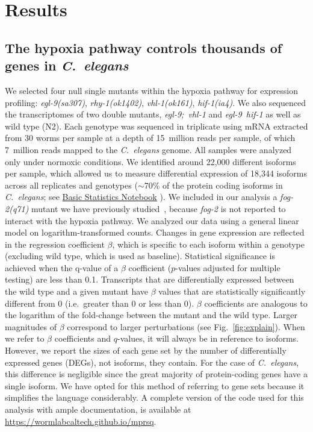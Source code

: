 \documentclass[9pt,twocolumn,twoside]{pnas-new}
\newcommand{\cel}{\emph{C.~elegans}}
\newcommand{\gene}[1]{\mbox{\emph{#1}}}
\begin{document}
\section*{Results}
\subsection*{The hypoxia pathway controls thousands of genes in \cel{}}
\label{sub:summary}

We selected four null single mutants within the hypoxia pathway for expression
profiling: \gene{egl-9(sa307)}, \gene{rhy-1(ok1402)}, \gene{vhl-1(ok161)},
\gene{hif-1(ia4)}. We also sequenced the transcriptomes of two double mutants,
\gene{egl-9; vhl-1} and \gene{egl-9 hif-1} as well as wild type (N2).
\color{purple}
Each genotype was sequenced in triplicate using mRNA extracted from 30 worms per
sample at a depth of 15~million reads per
sample, of which 7~million reads mapped to the \cel{} genome.
All samples were analyzed only under normoxic conditions.
\color{black}
We identified around
22,000 different isoforms per sample, which allowed us to measure differential
expression of 18,344 isoforms across all replicates and genotypes ($\sim$70\% of
the protein coding isoforms in \cel{}; see
\href{https://wormlabcaltech.github.io/mprsq/analysis_notebooks/1_basic_stats.html}
{Basic Statistics Notebook}
). We included in our analysis a
\gene{fog-2(q71)} mutant we have previously studied~\cite{Angeles-Albores2017a},
because \gene{fog-2} is not reported to interact with the hypoxia pathway. We
analyzed our data using a general linear model on logarithm-transformed counts.
Changes in gene expression are reflected in the regression coefficient $\beta$,
which is specific to each isoform within a genotype (excluding wild type, which
is used as baseline). Statistical significance is achieved when the q-value of a
$\beta$ coefficient ($p$-values adjusted for multiple testing) are less than 0.1.
Transcripts that are differentially expressed between the wild type and a
given mutant have $\beta$ values that are statistically significantly different
from 0 (i.e.\ greater than 0 or less than 0). $\beta$ coefficients are analogous
to the logarithm of the fold-change between the mutant and the wild type. Larger
magnitudes of $\beta$ correspond to larger perturbations (see
Fig.~\ref{fig:explain}). When we refer to $\beta$ coefficients and $q$-values,
it will always be in reference to isoforms. However, we report the sizes of each
gene set by the number of differentially expressed genes (DEGs), not
isoforms, they contain. For the case of \cel{}, this difference is negligible
since the great majority of protein-coding genes have a single isoform. We have
opted for this method of referring to gene sets because it simplifies the
language considerably. A complete version of the code used for this analysis
with ample documentation, is available at
\url{https://wormlabcaltech.github.io/mprsq}.
\end{document}

